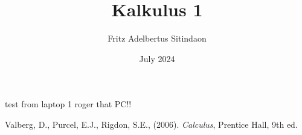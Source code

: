 \documentclass{article}
\title{Kalkulus 1}
\author{Fritz Adelbertus Sitindaon}
\date{July 2024}
\newcommand{\ds}{\displaystyle}
\begin{document}



% 
% 
% 
% 
% 

% 
% 
test from laptop 1 roger that PC!!

\begin{thebibliography}{9}
Valberg, D., Purcel, E.J., Rigdon, S.E., (2006). \emph{Calculus}, Prentice Hall, 9th ed.
\end{thebibliography}
\end{document}
